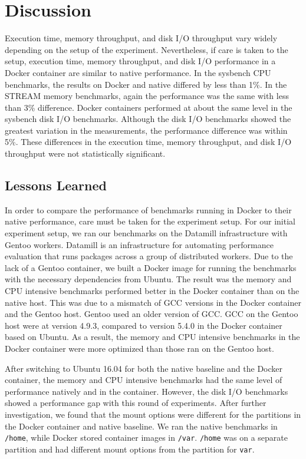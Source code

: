 \documentclass[11pt]{article}
\begin{document}
\section{Discussion}
Execution time, memory throughput, and disk I/O throughput vary widely depending on the setup of the experiment. Nevertheless, if care is taken to the setup, execution time, memory throughput, and disk I/O performance in a Docker container are similar to native performance. In the sysbench CPU benchmarks, the results on Docker and native differed by less than 1\%. In the STREAM memory benchmarks, again the performance was the same with less than 3\% difference. Docker containers performed at about the same level in the sysbench disk I/O benchmarks. Although the disk I/O benchmarks showed the greatest variation in the measurements, the performance difference was within 5\%. These differences in the execution time, memory throughput, and disk I/O throughput were not statistically significant. 


\subsection{Lessons Learned}
In order to compare the performance of benchmarks running in Docker to their native performance, care must be taken for the experiment setup. For our initial experiment setup, we ran our benchmarks on the Datamill infrastructure with Gentoo workers. Datamill is an infrastructure for automating performance evaluation that runs packages across a group of distributed workers. Due to the lack of a Gentoo container, we built a Docker image for running the benchmarks with the necessary dependencies from Ubuntu. The result was the memory and CPU intensive benchmarks performed better in the Docker container than on the native host. This was due to a mismatch of GCC versions in the Docker container and the Gentoo host. Gentoo used an older version of GCC. GCC on the Gentoo host were at version 4.9.3, compared to version 5.4.0 in the Docker container based on Ubuntu. As a result, the memory and CPU intensive benchmarks in the Docker container were more optimized than those ran on the Gentoo host. 

After switching to Ubuntu 16.04 for both the native baseline and the Docker container, the memory and  CPU intensive benchmarks had the same level of performance natively and in the container. However, the disk I/O benchmarks showed a performance gap with this round of experiments. After further investigation, we found that the mount options were different for the partitions in the Docker container and native baseline. We ran the native benchmarks in \texttt{/home}, while Docker stored container images in \texttt{/var}. \texttt{/home} was on a separate partition and had different mount options from the partition for \texttt{var}. 
\end{document}
